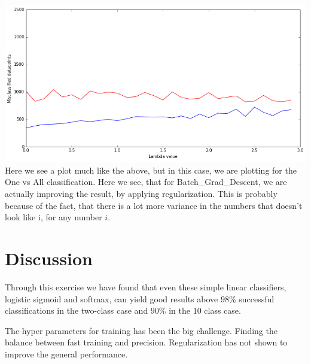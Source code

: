 \documentclass[a4paper,10pt,article,oneside,english]{memoir}
\begin{document}
\noindent\hspace{0.1\linewidth}\includegraphics[width=0.8\linewidth]{nll_plot4.png}\\
Here we see a plot much like the above, but in this case, we are plotting for the One vs All classification. Here we see, that for Batch\_Grad\_Descent, we are actually improving the result, by applying regularization. This is probably because of the fact, that there is a lot more variance in the numbers that doesn't look like i, for any number $i$.



\chapter{Discussion}
Through this exercise we have found that even these simple linear classifiers, logistic sigmoid and softmax, can yield good results above $98\%$ successful classifications in the two-class case and $90\%$ in the 10 class case.

The hyper parameters for training has been the big challenge. Finding the balance between fast training and precision. Regularization has not shown to improve the general performance. 



	
\end{document}
